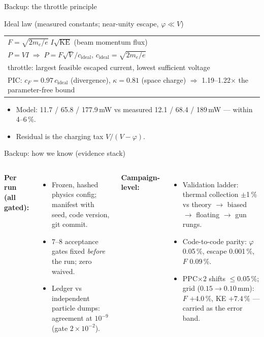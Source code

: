 \documentclass[10pt,aspectratio=169]{beamer}
\begin{document}
\begin{frame}{Backup: the throttle principle}
  \begin{block}{Ideal law (measured constants; near-unity escape,
      $\varphi \ll V$)}
    \centering\small
    \begin{tabular}{l}
      $F = \sqrt{2m_e/e}\; I\sqrt{\mathrm{KE}}$
        \hfill (beam momentum flux)\\[0.4ex]
      $P = V I \;\Rightarrow\; P = F\sqrt{V}/c_{\mathrm{ideal}}$,\quad
        $c_{\mathrm{ideal}} = \sqrt{2m_e/e}$\\[0.4ex]
      throttle: largest feasible escaped current, lowest sufficient
        voltage\\[0.4ex]
      \footnotesize PIC: $c_F = 0.97\,c_{\mathrm{ideal}}$ (divergence),
        $\kappa = 0.81$ (space charge) $\Rightarrow$ 1.19--1.22$\times$
        the parameter-free bound\\
    \end{tabular}
  \end{block}
  \begin{itemize}\small
    \item Model: 11.7 / 65.8 / 177.9\,mW vs measured 12.1 / 68.4 /
          189\,mW --- within 4--6\,\%.
    \item Residual is the charging tax $V/(V-\varphi)$.
  \end{itemize}
\end{frame}

\begin{frame}{Backup: how we know (evidence stack)}
  \begin{columns}
      \small\textbf{Per run (all gated):}
      \begin{itemize}\small
        \item Frozen, hashed physics config; manifest with seed,
              code version, git commit.
        \item 7--8 acceptance gates fixed \emph{before} the run;
              zero waived.
        \item Ledger vs independent particle dumps: agreement at
              $10^{-9}$ (gate $2\times10^{-2}$).
      \end{itemize}
      \small\textbf{Campaign-level:}
      \begin{itemize}\small
        \item Validation ladder: thermal collection $\pm$1\,\% vs
              theory $\to$ biased $\to$ floating $\to$ gun rungs.
        \item Code-to-code parity: $\varphi$ 0.05\,\%, escape
              0.001\,\%, $F$ 0.09\,\%.
        \item PPC$\times$2 shifts $\le$0.05\,\%; grid
              ($0.15\to0.10$\,mm): $F$ $+4.0$\,\%, KE $+7.4$\,\%
              --- carried as the error band.
      \end{itemize}
  \end{columns}
\end{frame}
\end{document}
